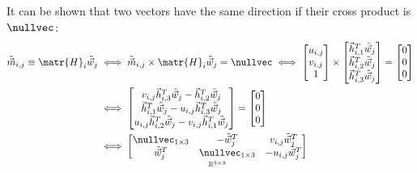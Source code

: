 \begin{description}
\begin{description}
                It can be shown that two vectors have the same direction if their cross product is $\nullvec$:
                \begin{align*}
                    \tilde{\vec{m}}_{i,j} \equiv \matr{H}_i \tilde{\vec{w}}_j 
                    &\iff
                        \tilde{\vec{m}}_{i,j} \times \matr{H}_i \tilde{\vec{w}}_j = \nullvec \iff
                        \begin{bmatrix} u_{i, j} \\ v_{i, j} \\ 1 \end{bmatrix} \times
                        \begin{bmatrix}
                            \vec{h}_{i, 1}^T \tilde{\vec{w}}_j \\ 
                            \vec{h}_{i, 2}^T \tilde{\vec{w}}_j \\ 
                            \vec{h}_{i, 3}^T \tilde{\vec{w}}_j
                        \end{bmatrix} =
                        \begin{bmatrix} 0 \\ 0 \\ 0 \end{bmatrix} 
                    \\
                    &\iff
                        \begin{bmatrix}
                            v_{i,j} \vec{h}_{i,3}^T \tilde{\vec{w}}_j - \vec{h}_{i, 2}^T \tilde{\vec{w}}_j \\
                            \vec{h}_{i, 1}^T \tilde{\vec{w}}_j - u_{i, j} \vec{h}_{i, 3}^T \tilde{\vec{w}}_j \\
                            u_{i, j} \vec{h}_{i, 2}^T \tilde{\vec{w}}_j - v_{i, j} \vec{h}_{i, 1}^T \tilde{\vec{w}}_j
                        \end{bmatrix} =
                        \begin{bmatrix} 0 \\ 0 \\ 0 \end{bmatrix} 
                    \\
                    &\iff
                        \underset{\mathbb{R}^{3 \times 9}}{\begin{bmatrix}
                            \nullvec_{1 \times 3} & -\tilde{\vec{w}}_j^T & v_{i,j} \tilde{\vec{w}}_j^T \\
                            \tilde{\vec{w}}_j^T & \nullvec_{1\times 3} & -u_{i,j} \tilde{\vec{w}}_j^T \\

\end{bmatrix}}
\end{align*}
\end{description}
\end{description}
